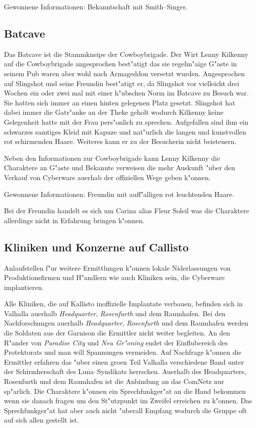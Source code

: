 \begin{remarks}
	Gewonnene Informationen: Bekanntschaft mit Smith--Singer.	
\end{remarks}

\subsection{Batcave}

Das Batcave ist die Stammkneipe der Cowboybrigade. Der Wirt Lenny Kilkenny auf die Cowboybrigade angesprochen best"atigt das sie regelm"a\3ige G"aste in seinem Pub waren aber wohl nach Armageddon versetzt wurden. Angesprochen auf Slingshot und seine Freundin best"atigt er, da\3 Slingshot vor vielleicht drei Wochen ein oder zwei mal mit einer h"ubschen Norm im Batcave zu Besuch war. Sie hatten sich immer an einen hinten gelegenen Platz gesetzt. Slingshot hat dabei immer die Gatr"anke an der Theke geholt wodurch Kilkenny keine Gelegenheit hatte mit der Frau pers"onlich zu sprechen. Aufgefallen sind ihm ein schwarzes samtiges Kleid mit Kapuze und nat"urlich die langen und kunstvollen rot schirmenden Haare. Weiteres kann er zu der Besucherin nicht beisteuern.

Neben den Informationen zur Cowboybrigade kann Lenny Kilkenny die Charaktere an G"aste und Bekannte verweisen die mehr Auskunft "uber den Verkauf von Cyberware au\3erhab der offiziellen Wege geben k"onnen.

\begin{remarks}
	Gewonnene Informationen: Freundin mit auff"alligen rot leuchtenden Haare. 
	
	Bei der Freundin handelt es sich um Carina alias Fleur Soleil was die Charaktere allerdings nicht in Erfahrung bringen k"onnen.
\end{remarks}	

\subsection{Kliniken und Konzerne auf Callisto}

Anlaufstellen f"ur weitere Ermittlungen k"onnen lokale Niderlassungen von Produktionsfirmen und H"andlern wie auch Kliniken sein, die Cyberware implantieren.

Alle Kliniken, die auf Kallisto inoffizielle Implantate verbauen, befinden sich in Valhalla au\3erhalb \emph{Headquarter}, \emph{Rosenfurth} und dem Raumhafen. Bei den Nachforschungen au\3erhalb \emph{Headquarter}, \emph{Rosenfurth} und dem Raumhafen werden die Soldaten aus der Garnison die Ermittler nicht weiter begleiten. An den R"ander von \emph{Paradise City} und \emph{Neu Gr"oning} endet der Einflu\3bereich des Protektorats und man will Spannungen vermeiden. Auf Nachfrage k"onnen die Ermittler erfahren das "uber einen gro\3en Teil Valhalla verschiedene Band unter der Schirmherschaft des Luna--Syndikats herrschen. Au\3erhalb des Headquarters, Rosenfurth und dem Raumhafen ist die Anbindung an das ComNetz nur sp"arlich. Die Charaktere k"onnen ein Sprechfunkger"at an die Hand bekommen wenn sie danach fragen um den St"utzpunkt im Zweifel erreichen zu k"onnen. Das Sprechfunkger"at hat aber auch nicht "uberall Empfang wodurch die Gruppe oft auf sich allen gestellt ist.

